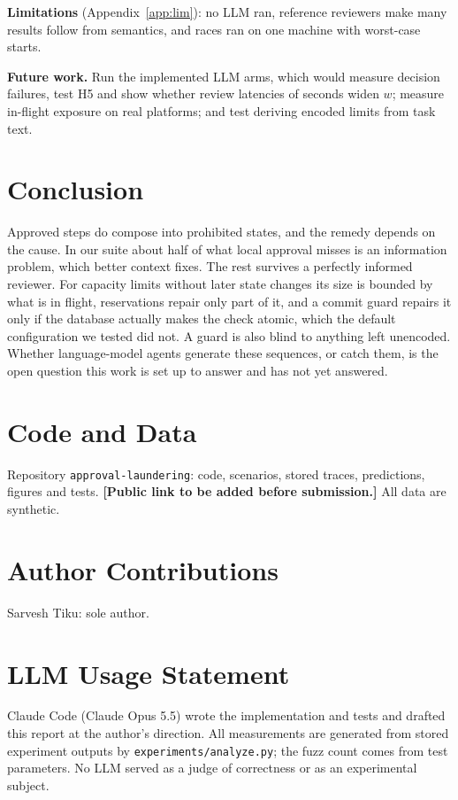\documentclass[10pt]{article}
\begin{document}
\textbf{Limitations} (Appendix~\ref{app:lim}): no LLM ran, reference reviewers make many results follow from semantics, and races ran on one machine with worst-case starts.

\textbf{Future work.} Run the implemented LLM arms, which would measure decision failures, test H5 and show whether review latencies of seconds widen $w$; measure in-flight exposure on real platforms; and test deriving encoded limits from task text.

\section{Conclusion}
Approved steps do compose into prohibited states, and the remedy depends on the cause. In our suite about half of what local approval misses is an information problem, which better context fixes. The rest survives a perfectly informed reviewer. For capacity limits without later state changes its size is bounded by what is in flight, reservations repair only part of it, and a commit guard repairs it only if the database actually makes the check atomic, which the default configuration we tested did not. A guard is also blind to anything left unencoded. Whether language-model agents generate these sequences, or catch them, is the open question this work is set up to answer and has not yet answered.

\vspace{-.7em}\section*{Code and Data}
Repository \texttt{approval-laundering}: code, scenarios, stored traces, predictions, figures and tests. \textbf{[Public link to be added before submission.]} All data are synthetic.

\vspace{-.7em}\section*{Author Contributions}
Sarvesh Tiku: sole author.

\vspace{-.7em}\section*{LLM Usage Statement}
Claude Code (Claude Opus 5.5) wrote the implementation and tests and drafted this report at the author's direction. All measurements are generated from stored experiment outputs by \texttt{experiments/analyze.py}; the fuzz count comes from test parameters. No LLM served as a judge of correctness or as an experimental subject.
\end{document}
